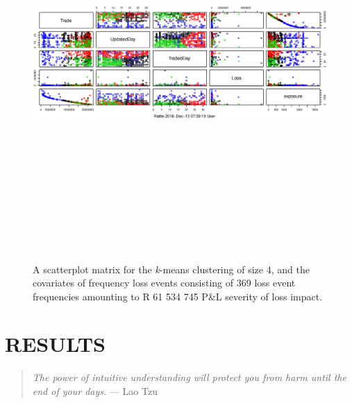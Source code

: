 \documentclass[]{DissertateUSU}
\begin{document}
\begin{figure}
\centering
\includegraphics[width=22.5cm, height=15cm]{CA14MeansPlot.eps}
\caption{A scatterplot matrix for the \emph{k}-means clustering of size 4, and the covariates of frequency loss events consisting of 369 loss event frequencies amounting to R 61 534 745 P\&L severity of loss impact.}
\label{CA14MeansPlot}
\end{figure}

\singlespacing

\FloatBarrier

\newpage

 \fancyhead[R]{\thepage} \fancyfoot[C]{}

\chapter{RESULTS}

\begin{quote}
\emph{The power of intuitive understanding will protect you from harm until the end of your days.}
--- Lao Tzu
\end{quote}

\doublespacing
\end{document}
